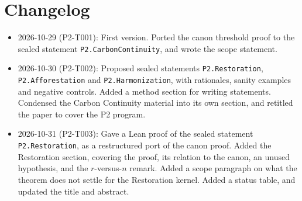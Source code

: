 \documentclass[11pt]{article}
\theoremstyle{definition}
\theoremstyle{remark}
\begin{document}
\section{Changelog}
\begin{itemize}
\item 2026-10-29 (P2-T001): First version. Ported the canon threshold proof to the sealed statement
\texttt{P2.CarbonContinuity}, and wrote the scope statement.
\item 2026-10-30 (P2-T002): Proposed sealed statements \texttt{P2.Restoration}, \texttt{P2.Afforestation} and \texttt{P2.Harmonization},
with rationales, sanity examples and negative controls. Added a method section for writing statements.
Condensed the Carbon Continuity material into its own section, and retitled the paper to cover the P2 program.
\item 2026-10-31 (P2-T003): Gave a Lean proof of the sealed statement \texttt{P2.Restoration}, as a restructured port of the canon
proof. Added the Restoration section, covering the proof, its relation to the canon, an unused hypothesis, and the $r$-versus-$n$ remark.
Added a scope paragraph on what the theorem does not settle for the Restoration kernel. Added a status table, and updated the title and abstract.
\end{itemize}



\end{document}
